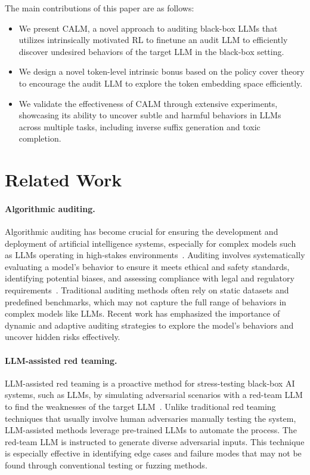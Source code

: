 \documentclass[letterpaper]{article} %
\newcommand{\ours}{\textsf{CALM}}
\begin{document}
The main contributions of this paper are as follows:
\begin{itemize}
	\item We present {\ours}, a novel approach to auditing black-box LLMs that utilizes intrinsically motivated RL to finetune an audit LLM to efficiently discover undesired behaviors of the target LLM in the black-box setting.
	\item We design a novel token-level intrinsic bonus based on the policy cover theory to encourage the audit LLM to explore the token embedding space efficiently.
	\item We validate the effectiveness of {\ours} through extensive experiments, showcasing its ability to uncover subtle and harmful behaviors in LLMs across multiple tasks, including inverse suffix generation and toxic completion.
\end{itemize}

\section{Related Work}

\paragraph{Algorithmic auditing.} Algorithmic auditing has become crucial for ensuring the development and deployment of artificial intelligence systems, especially for complex models such as LLMs operating in high-stakes environments~\cite{vecchione2021algorithmic}. Auditing involves systematically evaluating a model's behavior to ensure it meets ethical and safety standards, identifying potential biases, and assessing compliance with legal and regulatory requirements~\cite{casper2024black}. Traditional auditing methods often rely on static datasets and predefined benchmarks, which may not capture the full range of behaviors in complex models like LLMs. Recent work has emphasized the importance of dynamic and adaptive auditing strategies to explore the model's behaviors and uncover hidden risks effectively.

\paragraph{LLM-assisted red teaming.} LLM-assisted red teaming is a proactive method for stress-testing black-box AI systems, such as LLMs, by simulating adversarial scenarios with a red-team LLM to find the weaknesses of the target LLM~\cite{deng2022rlprompt,perez2022red,casper2023explore,hong2024curiosity}. Unlike traditional red teaming techniques that usually involve human adversaries manually testing the system, LLM-assisted methods leverage pre-trained LLMs to automate the process. The red-team LLM is instructed to generate diverse adversarial inputs. This technique is especially effective in identifying edge cases and failure modes that may not be found through conventional testing or fuzzing methods.
\end{document}
